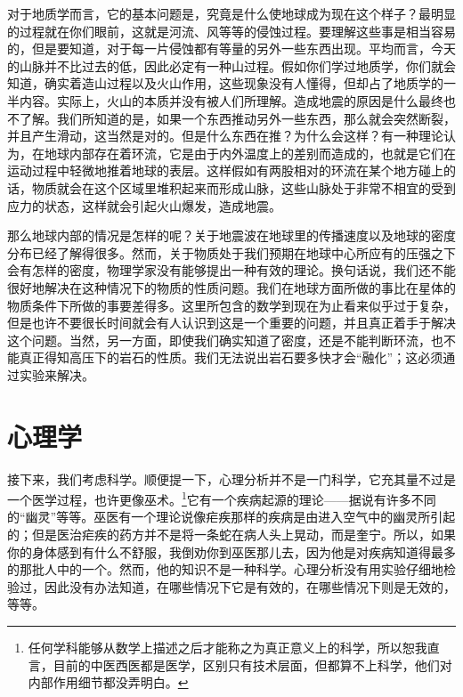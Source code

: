 \documentclass[12pt,oneside]{book}
\begin{document}
对于地质学而言，它的基本问题是，究竟是什么使地球成为现在这个样子？最明显的过程就在你们眼前，这就是河流、风等等的侵蚀过程。要理解这些事是相当容易的，但是要知道，对于每一片侵蚀都有等量的另外一些东西出现。平均而言，今天的山脉并不比过去的低，因此必定有一种山过程。假如你们学过地质学，你们就会知道，确实着造山过程以及火山作用，这些现象没有人懂得，但却占了地质学的一半内容。实际上，火山的本质并没有被人们所理解。造成地震的原因是什么最终也不了解。我们所知道的是，如果一个东西推动另外一些东西，那么就会突然断裂，并且产生滑动，这当然是对的。但是什么东西在推？为什么会这样？有一种理论认为，在地球内部存在着环流，它是由于内外温度上的差别而造成的，也就是它们在运动过程中轻微地推着地球的表层。这样假如有两股相对的环流在某个地方碰上的话，物质就会在这个区域里堆积起来而形成山脉，这些山脉处于非常不相宜的受到应力的状态，这样就会引起火山爆发，造成地震。

那么地球内部的情况是怎样的呢？关于地震波在地球里的传播速度以及地球的密度分布已经了解得很多。然而，关于物质处于我们预期在地球中心所应有的压强之下会有怎样的密度，物理学家没有能够提出一种有效的理论。换句话说，我们还不能很好地解决在这种情况下的物质的性质问题。我们在地球方面所做的事比在星体的物质条件下所做的事要差得多。这里所包含的数学到现在为止看来似乎过于复杂，但是也许不要很长时间就会有人认识到这是一个重要的问题，并且真正着手于解决这个问题。当然，另一方面，即使我们确实知道了密度，还是不能判断环流，也不能真正得知高压下的岩石的性质。我们无法说出岩石要多快才会“融化”；这必须通过实验来解决。


\section{心理学}
接下来，我们考虑科学。顺便提一下，心理分析并不是一门科学，它充其量不过是一个医学过程，也许更像巫术。\footnote{任何学科能够从数学上描述之后才能称之为真正意义上的科学，所以恕我直言，目前的中医西医都是医学，区别只有技术层面，但都算不上科学，他们对内部作用细节都没弄明白。}它有一个疾病起源的理论——据说有许多不同的“幽灵”等等。巫医有一个理论说像疟疾那样的疾病是由进入空气中的幽灵所引起的；但是医治疟疾的药方并不是将一条蛇在病人头上晃动，而是奎宁。所以，如果你的身体感到有什么不舒服，我倒劝你到巫医那儿去，因为他是对疾病知道得最多的那批人中的一个。然而，他的知识不是一种科学。心理分析没有用实验仔细地检验过，因此没有办法知道，在哪些情况下它是有效的，在哪些情况下则是无效的，等等。
\end{document}
